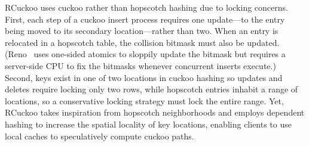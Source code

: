 \documentclass[12pt]{ucsddissertation}
\begin{document}
RCuckoo uses cuckoo rather than hopscotch hashing due to locking
concerns.
First, each step of a cuckoo insert process requires one update---to
the entry being moved to its secondary location---rather than two.
When an entry is relocated in a hopscotch table, the collision bitmask
must also be updated.  (Reno~\cite{reno} uses one-sided atomics to
sloppily update the bitmask but requires a server-side CPU to fix the
bitmasks whenever concurrent inserts execute.)  Second, keys exist in
one of two locations in cuckoo hashing so updates and deletes require
locking only two rows, while hopscotch entries inhabit a range of
locations, so a conservative locking strategy must lock the entire
range.  Yet, RCuckoo takes inspiration from hopscotch neighborhoods and employs dependent hashing to increase the spatial
locality of key locations, enabling clients to use local
caches to speculatively compute cuckoo paths.









\end{document}
